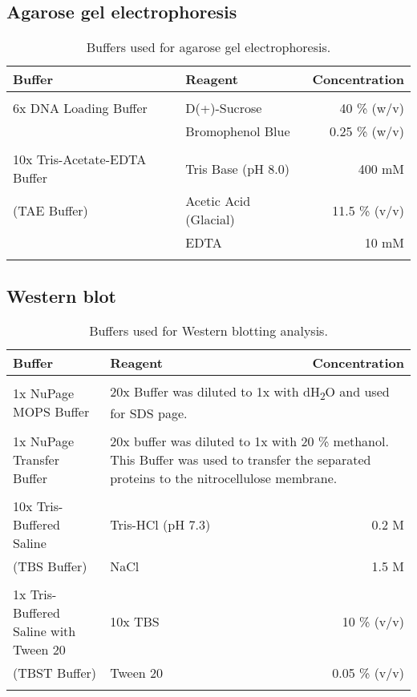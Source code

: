 \subsection{Agarose gel electrophoresis}

\begin{table}[H]
\begin{tabular}{l l r}
\textbf{Buffer} & \textbf{Reagent} & \textbf{Concentration}\\
\hline
\\
6x DNA Loading Buffer & D(+)-Sucrose & 40 \% (w/v) \\
& Bromophenol Blue & 0.25 \% (w/v)\\
\\
10x Tris-Acetate-EDTA Buffer & Tris Base (pH 8.0) & 400 mM \\
(TAE Buffer) & Acetic Acid (Glacial) & 11.5 \% (v/v) \\
& EDTA & 10 mM \\
\\
\end{tabular}
\caption[Agarose gel electrophoresis buffers]{Buffers used for agarose gel electrophoresis.}
\label{Gel electrophoresis}
\end{table}


\subsection{Western blot}

\begin{table}[H]
\begin{tabular}{l l r}
\textbf{Buffer} & \textbf{Reagent} & \textbf{Concentration}\\
\hline
\\
1x NuPage MOPS Buffer & \multicolumn{2}{p{8cm}}{20x Buffer was diluted to 1x with dH\textsubscript{2}O and used for SDS page.} \\
\\
1x NuPage Transfer Buffer & \multicolumn{2}{p{8cm}}{20x buffer was diluted to 1x with 20 \% methanol. This Buffer was used to transfer the separated proteins to the nitrocellulose membrane.} \\
\\
10x Tris-Buffered Saline & Tris-HCl (pH 7.3) & 0.2 M \\
(TBS Buffer) & NaCl & 1.5 M \\
\\
1x Tris-Buffered Saline with Tween 20 & 10x TBS & 10 \% (v/v) \\
(TBST Buffer) & Tween 20 & 0.05 \% (v/v)\\ 
\\
\end{tabular}

\caption[Western blot buffers]{Buffers used for Western blotting analysis.}
\label{Western blot}
\end{table}




